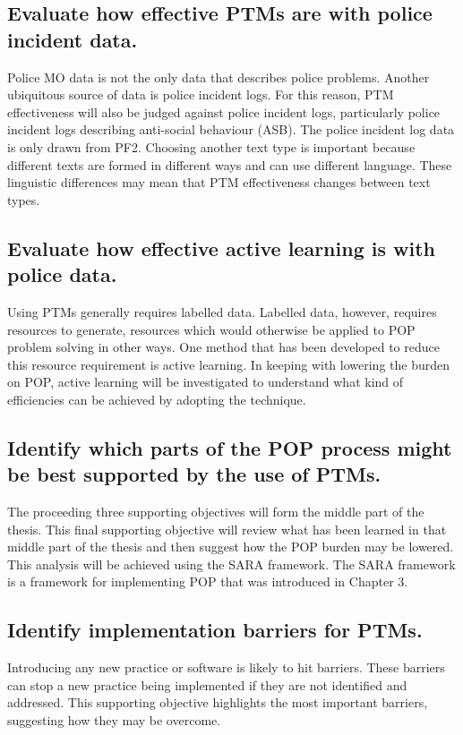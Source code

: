 \subsection{Evaluate how effective PTMs are with police incident data.} Police MO data is not the only data that describes police problems. Another ubiquitous source of data is police incident logs. For this reason, PTM effectiveness will also be judged against police incident logs, particularly police incident logs describing anti-social behaviour (ASB). The police incident log data is only drawn from PF2.  Choosing another text type is important because different texts are formed in different ways and can use different language. These linguistic differences may mean that PTM effectiveness changes between text types.

\subsection{Evaluate how effective active learning is with police data.} Using PTMs generally requires labelled data. Labelled data, however, requires resources to generate, resources which would otherwise be applied to POP problem solving in other ways. One method that has been developed to reduce this resource requirement is active learning. In keeping with lowering the burden on POP, active learning will be investigated to understand what kind of efficiencies can be achieved by adopting the technique.

\subsection{Identify which parts of the POP process might be best supported by the use of PTMs.} The proceeding three supporting objectives will form the middle part of the thesis. This final supporting objective will review what has been learned in that middle part of the thesis and then suggest how the POP burden may be lowered. This analysis will be achieved using the SARA framework. The SARA framework is a framework for implementing POP that was introduced in Chapter 3.

\subsection{Identify implementation barriers for PTMs.}Introducing any new practice or software is likely to hit barriers. These barriers can stop a new practice being implemented if they are not identified and addressed. This supporting objective highlights the most important barriers, suggesting how they may be overcome.

